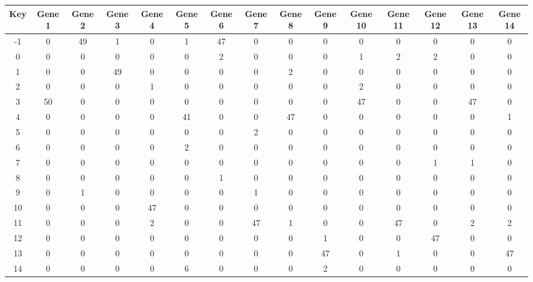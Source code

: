 \begin{tabular}{|c|c|c|c|c|c|c|c|c|c|c|c|c|c|c|}
\hline
Key & Gene 1 & Gene 2 & Gene 3 & Gene 4 & Gene 5 & Gene 6 & Gene 7 & Gene 8 & Gene 9 & Gene 10 & Gene 11 & Gene 12 & Gene 13 & Gene 14 \\
\hline
-1 & 0 & 49 & 1 & 0 & 1 & 47 & 0 & 0 & 0 & 0 & 0 & 0 & 0 & 0 \\
0 & 0 & 0 & 0 & 0 & 0 & 2 & 0 & 0 & 0 & 1 & 2 & 2 & 0 & 0 \\
1 & 0 & 0 & 49 & 0 & 0 & 0 & 0 & 2 & 0 & 0 & 0 & 0 & 0 & 0 \\
2 & 0 & 0 & 0 & 1 & 0 & 0 & 0 & 0 & 0 & 2 & 0 & 0 & 0 & 0 \\
3 & 50 & 0 & 0 & 0 & 0 & 0 & 0 & 0 & 0 & 47 & 0 & 0 & 47 & 0 \\
4 & 0 & 0 & 0 & 0 & 41 & 0 & 0 & 47 & 0 & 0 & 0 & 0 & 0 & 1 \\
5 & 0 & 0 & 0 & 0 & 0 & 0 & 2 & 0 & 0 & 0 & 0 & 0 & 0 & 0 \\
6 & 0 & 0 & 0 & 0 & 2 & 0 & 0 & 0 & 0 & 0 & 0 & 0 & 0 & 0 \\
7 & 0 & 0 & 0 & 0 & 0 & 0 & 0 & 0 & 0 & 0 & 0 & 1 & 1 & 0 \\
8 & 0 & 0 & 0 & 0 & 0 & 1 & 0 & 0 & 0 & 0 & 0 & 0 & 0 & 0 \\
9 & 0 & 1 & 0 & 0 & 0 & 0 & 1 & 0 & 0 & 0 & 0 & 0 & 0 & 0 \\
10 & 0 & 0 & 0 & 47 & 0 & 0 & 0 & 0 & 0 & 0 & 0 & 0 & 0 & 0 \\
11 & 0 & 0 & 0 & 2 & 0 & 0 & 47 & 1 & 0 & 0 & 47 & 0 & 2 & 2 \\
12 & 0 & 0 & 0 & 0 & 0 & 0 & 0 & 0 & 1 & 0 & 0 & 47 & 0 & 0 \\
13 & 0 & 0 & 0 & 0 & 0 & 0 & 0 & 0 & 47 & 0 & 1 & 0 & 0 & 47 \\
14 & 0 & 0 & 0 & 0 & 6 & 0 & 0 & 0 & 2 & 0 & 0 & 0 & 0 & 0 \\
\hline
\end{tabular}